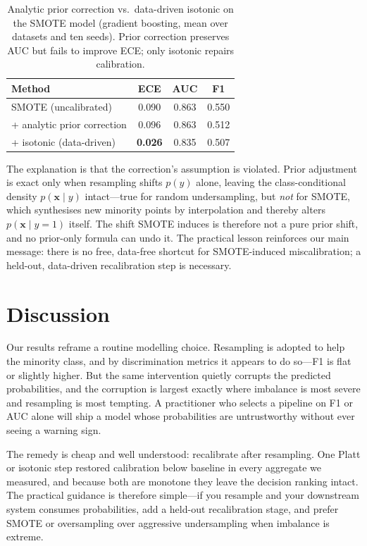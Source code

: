 \documentclass[conference]{IEEEtran}
\begin{document}
\begin{table}[t]
\caption{Analytic prior correction vs.\ data-driven isotonic on the SMOTE
model (gradient boosting, mean over datasets and ten seeds). Prior
correction preserves AUC but fails to improve ECE; only isotonic repairs
calibration.}
\label{tab:negative}
\centering
\begin{tabular}{lccc}
\toprule
Method & ECE & AUC & F1 \\
\midrule
SMOTE (uncalibrated) & 0.090 & 0.863 & 0.550 \\
\;+ analytic prior correction & 0.096 & 0.863 & 0.512 \\
\;+ isotonic (data-driven) & \textbf{0.026} & 0.835 & 0.507 \\
\bottomrule
\end{tabular}
\end{table}

The explanation is that the correction's assumption is violated. Prior
adjustment is exact only when resampling shifts $p(y)$ alone, leaving the
class-conditional density $p(\mathbf{x}\mid y)$ intact---true for
random undersampling, but \emph{not} for SMOTE, which synthesises new
minority points by interpolation and thereby alters $p(\mathbf{x}\mid
y{=}1)$ itself. The shift SMOTE induces is therefore not a pure prior
shift, and no prior-only formula can undo it. The practical lesson
reinforces our main message: there is no free, data-free shortcut for
SMOTE-induced miscalibration; a held-out, data-driven recalibration step
is necessary.

\section{Discussion}
Our results reframe a routine modelling choice. Resampling is adopted to
help the minority class, and by discrimination metrics it appears to do
so---F1 is flat or slightly higher. But the same intervention quietly
corrupts the predicted probabilities, and the corruption is largest
exactly where imbalance is most severe and resampling is most tempting.
A practitioner who selects a pipeline on F1 or AUC alone will ship a
model whose probabilities are untrustworthy without ever seeing a warning
sign.

The remedy is cheap and well understood: recalibrate after resampling.
One Platt or isotonic step restored calibration below baseline in every
aggregate we measured, and because both are monotone they leave the
decision ranking intact. The practical guidance is therefore simple---if
you resample and your downstream system consumes probabilities, add a
held-out recalibration stage, and prefer SMOTE or oversampling over
aggressive undersampling when imbalance is extreme.
\end{document}
